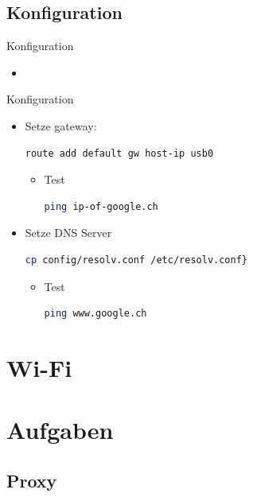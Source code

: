 \documentclass{beamer}
\begin{document}
\subsection{Konfiguration}
\begin{frame}[fragile]{Konfiguration}{\host}
  \begin{itemize}
  \item {}
  \end{itemize}
\end{frame}

\begin{frame}[fragile]{Konfiguration}{\target}
  \begin{itemize}
  \item Setze gateway:
  \begin{lstlisting}[language=bash]
route add default gw host-ip usb0
  \end{lstlisting}
  \begin{itemize}
  \item Test 
  \begin{lstlisting}[language=bash]
ping ip-of-google.ch  
  \end{lstlisting}
  \end{itemize}
  \item Setze DNS Server
  \begin{lstlisting}[language=bash]
cp config/resolv.conf /etc/resolv.conf}

  \end{lstlisting}
  \begin{itemize}
   \item Test 
   \begin{lstlisting}[language=bash]
ping www.google.ch 
   \end{lstlisting}
  \end{itemize}
  \end{itemize}
\end{frame}

\section{Wi-Fi}


\section{Aufgaben}
\subsection{Proxy}
\end{document}
